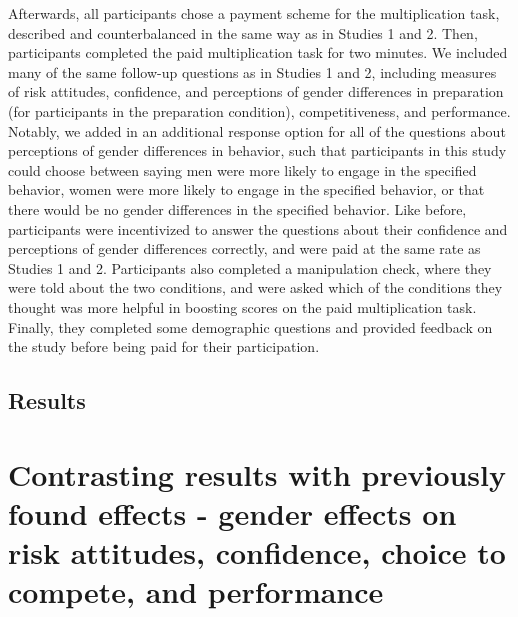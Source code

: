 \documentclass[a4paper,nobind]{templates/ociamthesis}
\begin{document}
Afterwards, all participants chose a payment scheme for the multiplication task, described and counterbalanced in the same way as in Studies 1 and 2. Then, participants completed the paid multiplication task for two minutes. We included many of the same follow-up questions as in Studies 1 and 2, including measures of risk attitudes, confidence, and perceptions of gender differences in preparation (for participants in the preparation condition), competitiveness, and performance. Notably, we added in an additional response option for all of the questions about perceptions of gender differences in behavior, such that participants in this study could choose between saying men were more likely to engage in the specified behavior, women were more likely to engage in the specified behavior, or that there would be no gender differences in the specified behavior. Like before, participants were incentivized to answer the questions about their confidence and perceptions of gender differences correctly, and were paid at the same rate as Studies 1 and 2. Participants also completed a manipulation check, where they were told about the two conditions, and were asked which of the conditions they thought was more helpful in boosting scores on the paid multiplication task. Finally, they completed some demographic questions and provided feedback on the study before being paid for their participation.

\hypertarget{results-2}{%
\subsection{Results}\label{results-2}}

\hypertarget{contrasting-results-with-previously-found-effects---gender-effects-on-risk-attitudes-confidence-choice-to-compete-and-performance}{%
\section{Contrasting results with previously found effects - gender effects on risk attitudes, confidence, choice to compete, and performance}\label{contrasting-results-with-previously-found-effects---gender-effects-on-risk-attitudes-confidence-choice-to-compete-and-performance}}
\end{document}
